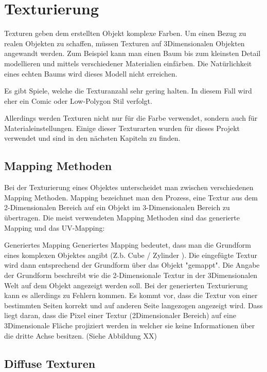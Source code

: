 \section{Texturierung}
\label{sec:tex}
Texturen geben dem erstellten Objekt komplexe Farben. Um einen Bezug zu realen Objekten zu schaffen, müssen Texturen
auf 3Dimensionalen Objekten angewandt werden. Zum Beispiel kann man einen Baum bis
zum kleinsten Detail modellieren und mittels verschiedener Materialien einfärben. Die Natürlichkeit
eines echten Baums wird dieses Modell nicht erreichen.

Es gibt Spiele, welche die Texturanzahl sehr gering halten. In diesem Fall wird eher ein Comic
oder Low-Polygon Stil verfolgt.

Allerdings werden Texturen nicht nur für die Farbe verwendet, sondern auch für Materialeinstellungen.
Einige dieser Texturarten wurden für dieses Projekt verwendet und
sind in den nächsten Kapiteln zu finden.

\subsection{Mapping Methoden}
\label{sec:tex_mapping}

Bei der Texturierung eines Objektes unterscheidet man zwischen verschiedenen Mapping Methoden. Mapping bezeichnet man
den Prozess, eine Textur aus dem 2-Dimensionalen Bereich auf ein Objekt im 3-Dimensionalen Bereich zu übertragen. Die
meist verwendeten Mapping Methoden sind das generierte Mapping und das UV-Mapping\citep{}:

Generiertes Mapping
Generiertes Mapping bedeutet, dass man die Grundform eines komplexen Objektes angibt (Z.b. Cube / Zylinder ). Die eingefügte Textur wird dann entsprechend der Grundform über das Objekt "gemappt". Die Angabe der Grundform beschreibt wie die 2-Dimensionale Textur in der 3Dimensionalen Welt auf dem Objekt angezeigt werden soll.
Bei der generierten Texturierung kann es allerdings zu Fehlern kommen. Es kommt vor, dass die Textur von einer bestimmten Seiten korrekt und auf anderen Seite langezogen angezeigt wird. Dass liegt daran, dass die Pixel einer Textur (2Dimensionaler Bereich) auf eine 3Dimensionale Fläche projiziert werden in welcher sie keine Informationen über die dritte Achse besitzen. (Siehe Abbildung XX)


\subsection{Diffuse Texturen}
\label{sec:tex_diffuse}

